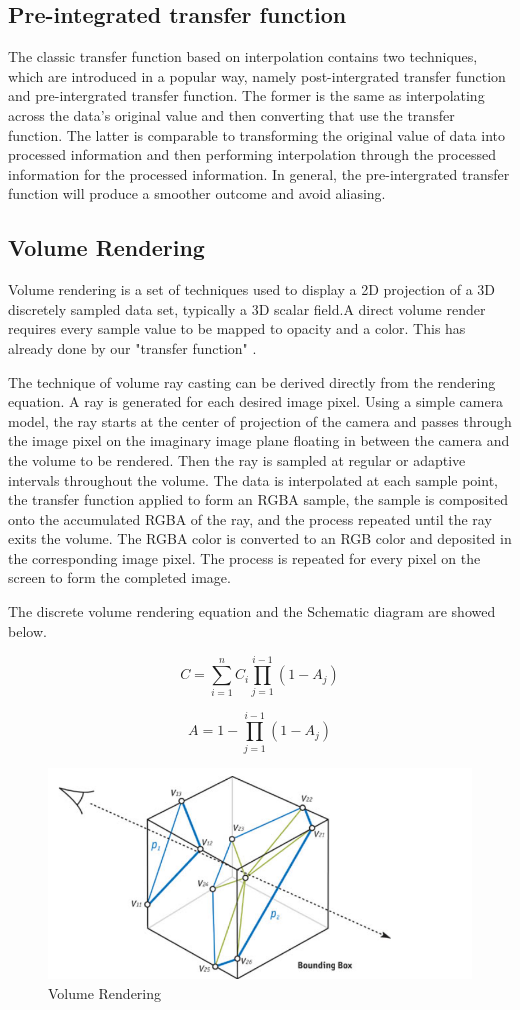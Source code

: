 \documentclass[sigconf]{acmart}
\begin{document}
\subsection{Pre-integrated transfer function}
The classic transfer function based on interpolation contains two techniques, which are introduced in a popular way, namely post-intergrated transfer function and pre-intergrated transfer function. The former is the same as interpolating across the data's original value and then converting that use the transfer function. The latter is comparable to transforming the original value of data into processed information and then performing interpolation through the processed information for the processed information. In general, the pre-intergrated transfer function will produce a smoother outcome and avoid aliasing.

\subsection{Volume Rendering}
Volume rendering is a set of techniques used to display a 2D projection of a 3D discretely sampled data set, typically a 3D scalar field.A direct volume render requires every sample value to be mapped to opacity and a color. This has already done by our "transfer function" .

The technique of volume ray casting can be derived directly from the rendering equation. A ray is generated for each desired image pixel. Using a simple camera model, the ray starts at the center of projection of the camera  and passes through the image pixel on the imaginary image plane floating in between the camera and the volume to be rendered. Then the ray is sampled at regular or adaptive intervals throughout the volume. The data is interpolated at each sample point, the transfer function applied to form an RGBA sample, the sample is composited onto the accumulated RGBA of the ray, and the process repeated until the ray exits the volume. The RGBA color is converted to an RGB color and deposited in the corresponding image pixel. The process is repeated for every pixel on the screen to form the completed image.

The discrete volume rendering equation and the Schematic diagram are showed below.

\[
C=\sum_{i=1}^{n}C_i\prod_{j=1}^{i-1}(1-A_j)
\]

\[
A=1 - \prod_{j=1}^{i-1}(1-A_j)
\]
\begin{figure}
    \centering
    \includegraphics[scale=0.4]{../imgs/volume2.png}
    \caption{Volume Rendering}
\end{figure}
\end{document}
